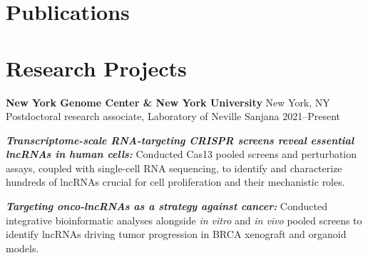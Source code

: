 \documentclass[letterpaper,11pt]{cv}
\begin{document}
\section{Publications}

\nocite{*}

\printbibliography[
    keyword={primary},
    heading=subbibliography,
    title={First authorship \footnotesize (* Equal contribution)}
    ]

\printbibliography[
    keyword={contributing},
    heading=subbibliography,
    title={Co-authorship}
    ]
    \section{Research Projects}
    \justifying
    \begin{entrylist}
    \raggedleft
    \item \textbf{New York Genome Center \& New York University} \hfill New York, NY\\
    Postdoctoral research associate, {Laboratory of Neville Sanjana } \hfill
    2021--Present
    \begin{detaillist}
        \item \textit{\textbf{Transcriptome-scale RNA-targeting CRISPR screens reveal essential lncRNAs in human cells:}} Conducted Cas13 pooled screens and perturbation assays, coupled with single-cell RNA sequencing, to identify and characterize hundreds of lncRNAs crucial for cell proliferation and their mechanistic roles.
        \item \textit{\textbf{Targeting onco-lncRNAs as a strategy against cancer:}} Conducted integrative bioinformatic analyses alongside \textit{in vitro} and \textit{in vivo} pooled screens to identify lncRNAs driving tumor progression in BRCA xenograft and organoid models. 
    \end{detaillist}
    

\end{entrylist}
\end{document}
